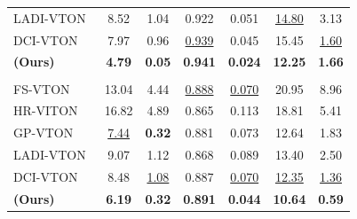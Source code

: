 \begin{table}[!t]
{\begin{tabular}{lcccccc}
LADI-VTON~\citep{morelli2023ladi}       & 8.52  & 1.04 & 0.922 & 0.051 & \underline{14.80} & 3.13 \\
DCI-VTON~\citep{gou2023taming}          & 7.97  & 0.96 & \underline{0.939} & 0.045 & 15.45 & \underline{1.60} \\
\textbf{\leffa{} (Ours)}                 & \textbf{4.79}  & \textbf{0.05} & \textbf{0.941} & \textbf{0.024} & \textbf{12.25} & \textbf{1.66} \\
\rowcolor{tablegray} \multicolumn{7}{c}{dresses} \\
FS-VTON~\citep{he2022style}             & 13.04 & 4.44 & \underline{0.888} & \underline{0.070} & 20.95 & 8.96 \\
HR-VITON~\citep{lee2022high}            & 16.82 & 4.89 & 0.865 & 0.113 & 18.81 & 5.41 \\
GP-VTON~\citep{xie2023gp}               & \underline{7.44}  & \textbf{0.32} & 0.881 & 0.073 & 12.64 & 1.83 \\
LADI-VTON~\citep{morelli2023ladi}       & 9.07  & 1.12 & 0.868 & 0.089 & 13.40 & 2.50 \\
DCI-VTON~\citep{gou2023taming}          & 8.48  & \underline{1.08} & 0.887 & \underline{0.070} & \underline{12.35} & \underline{1.36} \\
\textbf{\leffa{} (Ours)}                 & \textbf{6.19}  & \textbf{0.32} & \textbf{0.891} & \textbf{0.044} & \textbf{10.64} & \textbf{0.59} \\
\bottomrule[1.5pt]
\end{tabular}
}
\label{leffa:tab:dresscode_v2}
\end{table}



\begin{table}[!t]
\centering
\setlength{\tabcolsep}{0.2cm}
\caption{Ablation study on DressCode dataset for virtual try-on.
Our \leffa{} loss significantly improves model performance.
}
\label{leffa:tab:ablation_dress_code}
\end{table}


